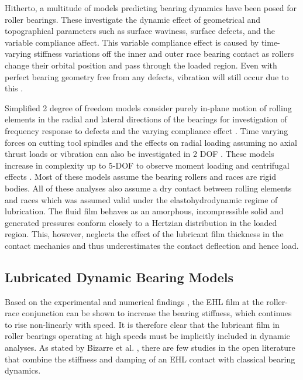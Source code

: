 Hitherto, a multitude of models predicting bearing dynamics have been posed for roller bearings. These investigate the dynamic effect of geometrical and topographical parameters such as surface waviness, surface defects, and the variable compliance affect. This variable compliance effect is caused by time-varying stiffness variations off the inner and outer race bearing contact as rollers change their orbital position and pass through the loaded region. Even with perfect bearing geometry free from any defects, vibration will still occur due to this \cite{Sopanen2003_1}.
  
Simplified 2 degree of freedom models \cite{Walters1971} consider purely in-plane motion of rolling elements in the radial and lateral directions of the bearings for investigation of frequency response to defects \cite{Meyer1980} and the varying compliance effect \cite{Sunnersjo1978}.  Time varying forces on cutting tool spindles and the effects on radial loading assuming no axial thrust loads or vibration can also be investigated in 2 DOF \cite{Matsubara1988}. These models increase in complexity up to 5-DOF  to observe moment loading and centrifugal effects \cite{Gupta1979} \cite{Aini1990} \cite{Rahnejat2004}. Most of these models assume the bearing rollers and races are rigid bodies. All of these analyses also assume a dry contact between rolling elements and races which was assumed valid under the elastohydrodynamic regime of lubrication. The fluid film behaves as an amorphous, incompressible solid and generated pressures conform closely to a Hertzian distribution in the loaded region. This, however, neglects the effect of the lubricant film thickness in the contact mechanics and thus underestimates the contact deflection and hence load.

\subsection{Lubricated Dynamic Bearing Models}

Based on the experimental and numerical findings \cite{Questa2020} \cite{Stone1982} \cite{Dietl1997}, the EHL film at the roller-race conjunction can be shown to increase the bearing stiffness, which continues to rise non-linearly with speed. It is therefore clear that the lubricant film in roller bearings operating at high speeds must be implicitly included in dynamic analyses. As stated by Bizarre et al. \cite{Bizarre2018}, there are few studies in the open literature that combine the stiffness and damping of an EHL contact with classical bearing dynamics.

